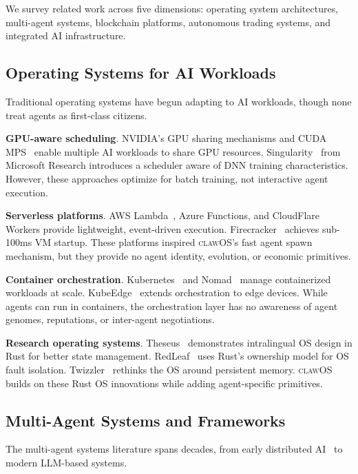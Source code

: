 \documentclass{article}
\newcommand{\clawos}{\textsc{clawOS}}
\begin{document}
We survey related work across five dimensions: operating system architectures, multi-agent systems, blockchain platforms, autonomous trading systems, and integrated AI infrastructure.

\subsection{Operating Systems for AI Workloads}

Traditional operating systems have begun adapting to AI workloads, though none treat agents as first-class citizens.

\textbf{GPU-aware scheduling}. NVIDIA's GPU sharing mechanisms and CUDA MPS~\cite{nvidia2024mps} enable multiple AI workloads to share GPU resources. Singularity~\cite{singularity2022} from Microsoft Research introduces a scheduler aware of DNN training characteristics. However, these approaches optimize for batch training, not interactive agent execution.

\textbf{Serverless platforms}. AWS Lambda~\cite{awslambda2024}, Azure Functions, and CloudFlare Workers provide lightweight, event-driven execution. Firecracker~\cite{agache2020firecracker} achieves sub-100ms VM startup. These platforms inspired \clawos{}'s fast agent spawn mechanism, but they provide no agent identity, evolution, or economic primitives.

\textbf{Container orchestration}. Kubernetes~\cite{burns2016borg} and Nomad~\cite{hashicorp2024nomad} manage containerized workloads at scale. KubeEdge~\cite{xiong2023kubeedge} extends orchestration to edge devices. While agents can run in containers, the orchestration layer has no awareness of agent genomes, reputations, or inter-agent negotiations.

\textbf{Research operating systems}. Theseus~\cite{boos2020theseus} demonstrates intralingual OS design in Rust for better state management. RedLeaf~\cite{narayanan2020redleaf} uses Rust's ownership model for OS fault isolation. Twizzler~\cite{bittman2020twizzler} rethinks the OS around persistent memory. \clawos{} builds on these Rust OS innovations while adding agent-specific primitives.

\subsection{Multi-Agent Systems and Frameworks}

The multi-agent systems literature spans decades, from early distributed AI~\cite{wooldridge2009introduction} to modern LLM-based systems.
\end{document}
